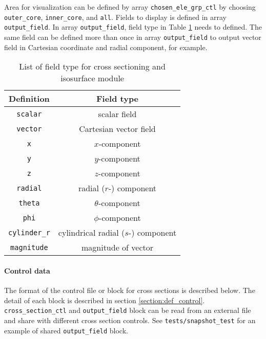 Area for visualization can be defined by array \verb|chosen_ele_grp_ctl| by choosing \verb|outer_core|, \verb|inner_core|, and \verb|all|. Fields to display is defined in array \verb|output_field|. In array \verb|output_field|, field type in Table \ref{table:field_type} needs to defined. The same field can be defined more than once in array \verb|output_field| to output vector field in Cartesian coordinate and radial component, for example.
%
\begin{table}[htp]
\caption{List of field type for cross sectioning and isosurface module}
\label{table:field_type}
\begin{center} 
\begin{tabular}{|c|c|}
\hline
 Definition & Field type  \\ \hline \hline
 \verb|scalar| & scalar field  \\ \hline
 \verb|vector| & Cartesian vector field \\ \hline
 \verb|x| & $x$-component  \\ \hline
 \verb|y| & $y$-component  \\ \hline
 \verb|z| & $z$-component  \\ \hline
 \verb|radial| & radial ($r$-) component  \\ \hline
 \verb|theta| & $\theta$-component  \\ \hline
 \verb|phi| & $\phi$-component  \\ \hline
 \verb|cylinder_r| & cylindrical radial ($s$-) component  \\ \hline
 \verb|magnitude| & magnitude of vector  \\ \hline
\end{tabular}
\end{center}
\end{table}
%
\paragraph{Control data} \label{section:section_control}
The format of the control file or block for cross sections is described below. The detail of each block is described in section \ref{section:def_control}.  \verb|cross_section_ctl| and \verb|output_field| block can be read from an external file and share with different cross section controls. See \verb|tests/snapshot_test| for an example of shared \verb|output_field| block.

